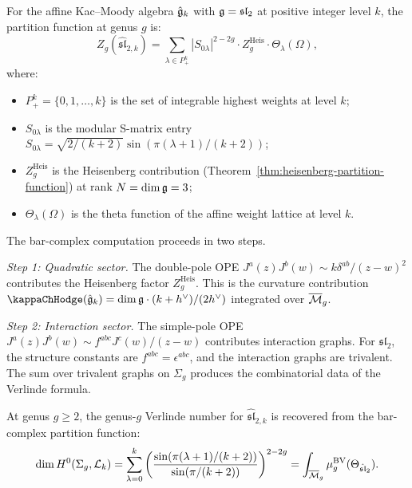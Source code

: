 \begin{construction}
For the affine Kac--Moody algebra $\hat{\mathfrak{g}}_k$ with $\mathfrak{g} =
\mathfrak{sl}_2$ at positive integer level $k$, the partition function
at genus $g$ is:
\[
Z_g(\hat{\mathfrak{sl}}_{2,k})
 = \sum_{\lambda \in P^k_+}
 |S_{0\lambda}|^{2-2g} \cdot Z^{\mathrm{Heis}}_g
 \cdot \Theta_\lambda(\Omega),
\]
where:
\begin{itemize}
\item $P^k_+ = \{0, 1, \ldots, k\}$ is the set of integrable
 highest weights at level $k$;
\item $S_{0\lambda}$ is the modular S-matrix entry
 $S_{0\lambda} = \sqrt{2/(k+2)} \sin(\pi(\lambda+1)/(k+2))$;
\item $Z^{\mathrm{Heis}}_g$ is the Heisenberg contribution
 (Theorem~\ref{thm:heisenberg-partition-function}) at rank $N = \dim \mathfrak{g}
 = 3$;
\item $\Theta_\lambda(\Omega)$ is the theta function of the affine
 weight lattice at level $k$.
\end{itemize}

The bar-complex computation proceeds in two steps.

\emph{Step 1: Quadratic sector.} The double-pole OPE
$J^a(z) J^b(w) \sim k \delta^{ab}/(z-w)^2$ contributes the Heisenberg
factor $Z^{\mathrm{Heis}}_g$. This is the curvature contribution
$\kappaChHodge(\hat{\fg}_k) = \dim \fg \cdot (k + h^\vee) / (2h^\vee)$ integrated over
$\overline{\mathcal{M}}_g$.

\emph{Step 2: Interaction sector.} The simple-pole OPE
$J^a(z) J^b(w) \sim f^{abc} J^c(w)/(z-w)$ contributes interaction
graphs. For $\mathfrak{sl}_2$, the structure constants are
$f^{abc} = \epsilon^{abc}$, and the interaction graphs are trivalent.
The sum over trivalent graphs on $\Sigma_g$ produces the combinatorial
data of the Verlinde formula.
\end{construction}

\begin{theorem}
At genus $g \geq 2$, the genus-$g$ Verlinde number for $\hat{\mathfrak{sl}}_{2,k}$
is recovered from the bar-complex partition function:
\[
\dim H^0(\Sigma_g, \mathcal{L}_k)
 = \sum_{\lambda=0}^{k}
 \left(\frac{\sin(\pi(\lambda+1)/(k+2))}
 {\sin(\pi/(k+2))}\right)^{2-2g}
 = \int_{\overline{\mathcal{M}}_g} \mu^{\mathrm{BV}}_g(\Theta_{\hat{\mathfrak{sl}}_2}).
\]
\end{theorem}

